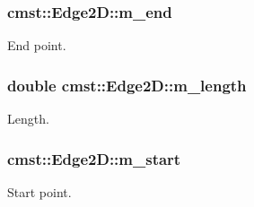 \subsubsection[{\texorpdfstring{m\_end}{m_end}}]{ cmst::Edge2D::m\_end\hspace{0.3cm}{\ttfamily [private]}}\hypertarget{classcmst_1_1_edge2_d_a26aabda4fcc506ae340392e78f92e49b}{}\label{classcmst_1_1_edge2_d_a26aabda4fcc506ae340392e78f92e49b}


End point. 

\subsubsection[{\texorpdfstring{m\_length}{m_length}}]{\setlength{\rightskip}{0pt plus 5cm}double cmst::Edge2D::m\_length\hspace{0.3cm}{\ttfamily [private]}}\hypertarget{classcmst_1_1_edge2_d_ab461fb636aa7f76af613c63c681c186e}{}\label{classcmst_1_1_edge2_d_ab461fb636aa7f76af613c63c681c186e}


Length. 

\subsubsection[{\texorpdfstring{m\_start}{m_start}}]{ cmst::Edge2D::m\_start\hspace{0.3cm}{\ttfamily [private]}}\hypertarget{classcmst_1_1_edge2_d_a8c0ca77824a84a48c714aaec5da72ad7}{}\label{classcmst_1_1_edge2_d_a8c0ca77824a84a48c714aaec5da72ad7}


Start point. 

